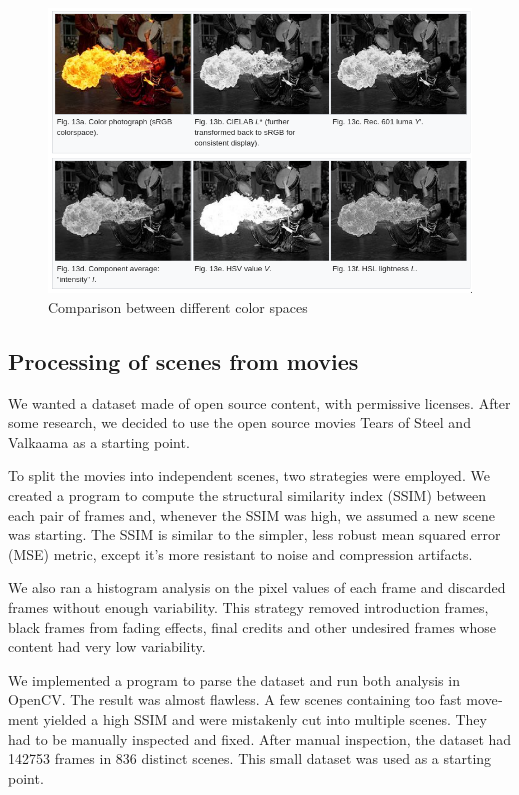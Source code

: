 \documentclass[12pt,openright,oneside,a4paper,english]{abntex2}
\begin{document}
\begin{otherlanguage}{english}
\begin{figure}[!htb]
\centering
\includegraphics[width=\textwidth]{Colorspaces}
\caption{Comparison between different color spaces \cite{wiki_HSV}}
\label{hsl_hsv}
\end{figure}

\subsection{Processing of scenes from movies}

We wanted a dataset made of open source content, with permissive licenses. After some research, we decided to use the open source movies Tears of Steel \cite{tears_of_steel_movie} and Valkaama \cite{valkaama_movie} as a starting point. %

To split the movies into independent scenes, two strategies were employed. We created a program to compute the structural similarity index (SSIM) between each pair of frames and, whenever the SSIM was high, we assumed a new scene was starting. The SSIM is similar to the simpler, less robust mean squared error (MSE) metric, except it's more resistant to noise and compression artifacts.

We also ran a histogram analysis on the pixel values of each frame and discarded frames without enough variability. This strategy removed introduction frames, black frames from fading effects, final credits and other undesired frames whose content had very low variability.

We implemented a program to parse the dataset and run both analysis in OpenCV. The result was almost flawless. A few scenes containing too fast movement yielded a high SSIM and were mistakenly cut into multiple scenes. They had to be manually inspected and fixed. After manual inspection, the dataset had 142753 frames in 836 distinct scenes. This small dataset was used as a starting point.


\end{otherlanguage}
\end{document}
